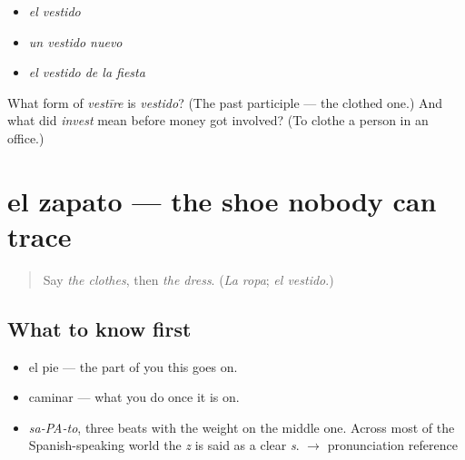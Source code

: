 \begin{itemize}
\raggedright
  \item \emph{el vestido}
  \item \emph{un vestido nuevo}
  \item \emph{el vestido de la fiesta}
\end{itemize}

\begin{tcolorbox}[breakable,colback=teal!4,colframe=teal!35!black,title={Before you move on}]
What form of \emph{vestīre} is \emph{vestido}? (The past participle — the clothed one.) And what did \emph{invest} mean before money got involved? (To clothe a person in an office.)
\end{tcolorbox}
\section[el zapato]{el zapato — the shoe nobody can trace}

\label{lesson:ES-C360-zapato}



\begin{quote}
Say \emph{the clothes}, then \emph{the dress}. (\emph{La ropa}; \emph{el vestido}.)
\end{quote}

\subsection*{What to know first}
\begin{itemize}
\raggedright
  \item el pie — the part of you this goes on.
  \item caminar — what you do once it is on.
\end{itemize}

\begin{sounds}
\begin{itemize}
\raggedright
  \item \emph{sa-PA-to}, three beats with the weight on the middle one. Across most of the Spanish-speaking world the \emph{z} is said as a clear \emph{s}. $\to$ pronunciation reference
\end{itemize}
\end{sounds}

